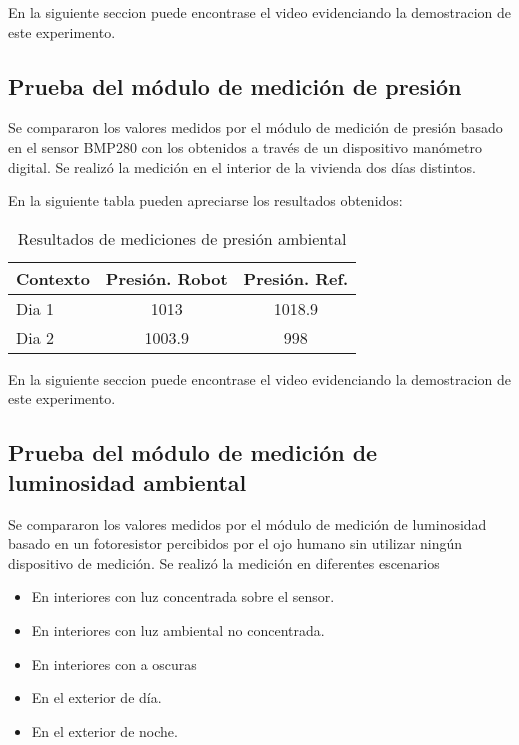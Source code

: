 En la siguiente seccion puede encontrase el video \cite{DemoMediciones} evidenciando la demostracion de este experimento.

\subsection{Prueba del módulo de medición de presión}

Se compararon los valores medidos por el módulo de medición de presión basado en el sensor BMP280 con los obtenidos a través de un dispositivo manómetro digital. Se realizó la medición en el interior de la vivienda dos días distintos.

En la siguiente tabla pueden apreciarse los resultados obtenidos:

\begin{table}[h]
\centering
\caption[Resultados de mediciones de presión ambiental]{Resultados de mediciones de presión ambiental}
\begin{tabular}{l c c}
\toprule
\textbf{Contexto} & \textbf{Presión. Robot} & \textbf{Presión. Ref.} \\
\midrule
Dia 1 & 1013 & 1018.9 \\
Dia 2 & 1003.9 & 998 \\
\bottomrule
\hline
\end{tabular}
\end{table}

En la siguiente seccion puede encontrase el video \cite{DemoMediciones} evidenciando la demostracion de este experimento.

\subsection{Prueba del módulo de medición de luminosidad ambiental}

Se compararon los valores medidos por el módulo de medición de luminosidad basado en un fotoresistor percibidos por el ojo humano sin utilizar ningún dispositivo de medición. Se realizó la medición en diferentes escenarios

\begin{itemize}
	\item En interiores con luz concentrada sobre el sensor.
	\item En interiores con luz ambiental no concentrada.
	\item En interiores con a oscuras
	\item En el exterior de día.
	\item En el exterior de noche.
\end{itemize}

